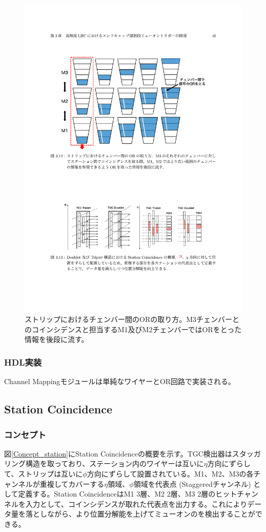 \begin{figure} 
\centering
\includegraphics[width=16cm]{fig/SL/Channel_Mapping.pdf}
\caption[]{ストリップにおけるチェンバー間のORの取り方。M3チェンバーとのコインシデンスと担当するM1及びM2チェンバーではORをとった情報を後段に流す。\cite{mt_kawamoto}}
\label{Channel_Mapping}
\end{figure}

\subsubsection*{HDL実装}
Channel Mappingモジュールは単純なワイヤーとOR回路で実装される。

\subsection{Station Coincidence}
\subsubsection*{コンセプト}
図\ref{Concept_station}にStation Coincidenceの概要を示す。TGC検出器はスタッガリング構造を取っており、ステーション内のワイヤーは互いに$\eta$方向にずらして、ストリップは互いに$\phi$方向にずらして設置されている。M1、M2、M3の各チャンネルが重複してカバーする$\eta$領域、$\phi$領域を代表点 (Staggeredチャンネル) として定義する。Station CoincidenceはM1 3層、M2 2層、M3 2層のヒットチャンネルを入力として、コインシデンスが取れた代表点を出力する。これによりデータ量を落としながら、より位置分解能を上げてミューオンのを検出することができる。

